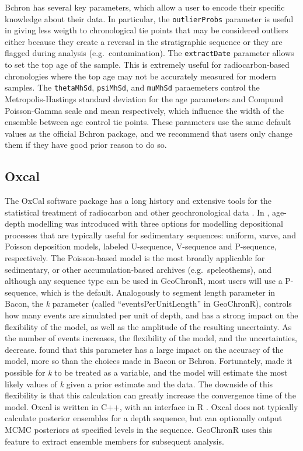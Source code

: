 \documentclass[gchron, manuscript]{copernicus}
\begin{document}
Bchron has several key parameters, which allow a user to encode their specific knowledge about their data.
In particular, the \texttt{outlierProbs} parameter is useful in giving less weigth to chronological tie points that may be considered outliers either because they create a reversal in the stratigraphic sequence or they are flagged during analysis (e.g.~contamination).
The \texttt{extractDate} parameter allows to set the top age of the sample.
This is extremely useful for radiocarbon-based chronologies where the top age may not be accurately measured for modern samples.
The \texttt{thetaMhSd}, \texttt{psiMhSd}, and \texttt{muMhSd} paraemeters control the Metropolis-Hastings standard deviation for the age parameters and Compund Poisson-Gamma scale and mean respectively, which influence the width of the ensemble between age control tie points.
These parameters use the same default values as the official Bchron package, and we recommend that users only change them if they have good prior reason to do so.

\subsection{Oxcal}

The OxCal software package has a long history and extensive tools for the statistical treatment of radiocarbon and other geochronological data \citep{BronkRamsey95}.
In \citet{ramsey2008deposition}, age-depth modelling was introduced with three options for modelling depositional processes that are typically useful for sedimentary sequences: uniform, varve, and Poisson deposition models, labeled U-sequence, V-sequence and P-sequence, respectively.
The Poisson-based model is the most broadly applicable for sedimentary, or other accumulation-based archives (e.g.~speleothems), and although any sequence type can be used in GeoChronR, most users will use a P-sequence, which is the default.
Analogously to segment length parameter in Bacon, the \emph{k} parameter (called ``eventsPerUnitLength'' in GeoChronR), controls how many events are simulated per unit of depth, and has a strong impact on the flexibility of the model, as well as the amplitude of the resulting uncertainty.
As the number of events increases, the flexibility of the model, and the uncertainties, decrease.
\citet{trachsel2017} found that this parameter has a large impact on the accuracy of the model, more so than the choices made in Bacon or Bchron.
Fortunately, \citet{bronkramsey2010} made it possible for \emph{k} to be treated as a variable, and the model will estimate the most likely values of \emph{k} given a prior estimate and the data. The downside of this flexibility is that this calculation can greatly increase the convergence time of the model. Oxcal is written in C++, with an interface in R \citep{oxcAAR}. Oxcal does not typically calculate posterior ensembles for a depth sequence, but can optionally output MCMC posteriors at specified levels in the sequence. GeoChronR uses this feature to extract ensemble members for subsequent analysis.
\end{document}
